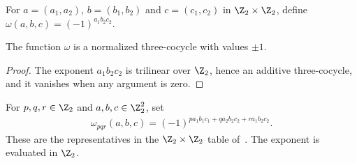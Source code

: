 \begin{definition}
    \label{def:asymex_group_cocycle_klein}
    \leanok
    For $a=(a_1,a_2)$, $b=(b_1,b_2)$ and $c=(c_1,c_2)$ in $\Z_2\times\Z_2$,
    define $\omega(a,b,c)=(-1)^{a_1b_2c_2}$.
\end{definition}

\begin{lemma}
    \label{thm:asymex_group_cocycle_klein}
    \leanok
    The function $\omega$ is a normalized three-cocycle with values $\pm1$.
\end{lemma}
\begin{proof}
    \leanok
    The exponent $a_1b_2c_2$ is trilinear over $\Z_2$, hence an additive
    three-cocycle, and it vanishes when any argument is zero.
\end{proof}

\begin{definition}
    \label{def:asymex_klein_cocycle_family}
    \leanok
    For $p,q,r\in\Z_2$ and $a,b,c\in\Z_2^2$, set
    \begin{align}
        \omega_{pqr}(a,b,c)
        =(-1)^{p a_1b_1c_1+q a_2b_2c_2+r a_1b_2c_2}.
    \end{align}
    These are the representatives in the $\Z_2\times\Z_2$ table
    of~\cite[Section~6]{GarreRubio2023MPOSym}. The exponent is evaluated in $\Z_2$.
\end{definition}

